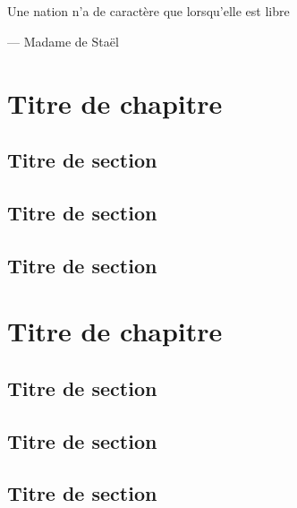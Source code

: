\documentclass{book}
\makeatletter
\newcommand{\tableofcontents@hook}{}
\newcommand{\tableofcontentshook}[1]{\renewcommand{\tableofcontents@hook}{#1}}
\renewcommand\tableofcontents{%
			\if@twocolumn
				\@restonecoltrue\onecolumn
			\else
				\@restonecolfalse
			\fi
			\chapter*{ %
				\contentsname
				\@mkboth{%
					\MakeUppercase\contentsname}{\MakeUppercase\contentsname}%
			}%
			\tableofcontents@hook
			\@starttoc{toc}%
			\if@restonecol\twocolumn\fi
		}
\makeatother
\begin{document}
\tableofcontentshook{
	\begin{flushright}
		Une nation n'a de caract\`ere que lorsqu'elle est libre

		--- Madame de Sta\"el
	\end{flushright}
}
\tableofcontents

\chapter{Titre de chapitre}
	\section{Titre de section}
	\section{Titre de section}
	\section{Titre de section}

\chapter{Titre de chapitre}
	\section{Titre de section}
	\section{Titre de section}
	\section{Titre de section}
\end{document}
